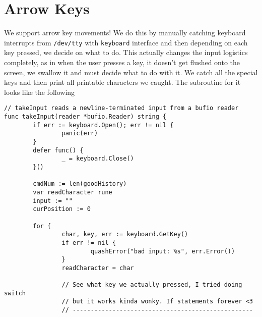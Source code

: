 \documentclass[12pt]{article}
\begin{document}
\section{Arrow Keys}
\label{sec:org900f852}
We support arrow key movements! We do this by manually catching keyboard
interrupts from \texttt{/dev/tty} with \texttt{keyboard} interface and then depending on each
key pressed, we decide on what to do. This actually changes the input
logistics completely, as in when the user presses a key, it doesn't get
flushed onto the screen, we swallow it and must decide what to do with it. We
catch all the special keys and then print all printable characters we
caught. The subroutine for it looks like the following
\begin{verbatim}
// takeInput reads a newline-terminated input from a bufio reader
func takeInput(reader *bufio.Reader) string {
        if err := keyboard.Open(); err != nil {
                panic(err)
        }
        defer func() {
                _ = keyboard.Close()
        }()

        cmdNum := len(goodHistory)
        var readCharacter rune
        input := ""
        curPosition := 0

        for {
                char, key, err := keyboard.GetKey()
                if err != nil {
                        quashError("bad input: %s", err.Error())
                }
                readCharacter = char

                // See what key we actually pressed, I tried doing switch
                // but it works kinda wonky. If statements forever <3
                // --------------------------------------------------


\end{verbatim}
\end{document}
